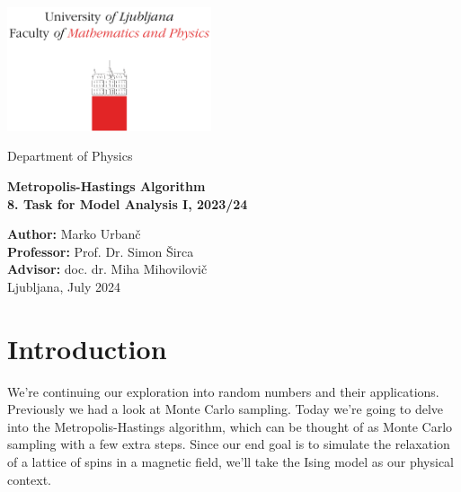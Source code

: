 \documentclass[10pt, titlepage, a4paper]{article}
\begin{document}
\begin{titlepage}
{\centering
\includegraphics[width=6cm]{logo_fmf.pdf}

\vspace{0.8cm}
{\small Department of Physics}

\vspace{5cm}
\vspace{0.5cm}
{\huge\textbf{Metropolis-Hastings Algorithm}} \\
\vspace{0.5cm}
{\large\textbf{8. Task for Model Analysis I, 2023/24}}

\vfill
\textbf{Author:} Marko Urbanč \\
\textbf{Professor:} Prof. Dr. Simon Širca \\ 
\textbf{Advisor:} doc. dr. Miha Mihovilovič \\

\vspace{1cm}
Ljubljana, July 2024 \\
}
\vspace{3cm}
\end{titlepage}

\hypersetup{pageanchor=true}
\setcounter{page}{2}
\tableofcontents
\vspace{1cm}


\section{Introduction}
We're continuing our exploration into random numbers and their applications. Previously we had a look at Monte Carlo 
sampling. Today we're going to delve into the Metropolis-Hastings algorithm, which can be thought of as Monte Carlo 
sampling with a few extra steps. Since our end goal is to simulate the relaxation of a lattice of spins in a magnetic
field, we'll take the Ising model as our physical context. \\
\end{document}
